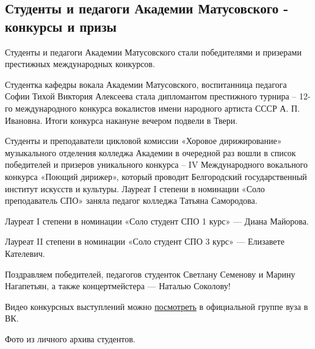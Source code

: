  
 
 
 
 
\subsection{Студенты и педагоги Академии Матусовского - конкурсы и призы}


Студенты и педагоги Академии Матусовского стали победителями и призерами
престижных международных конкурсов.


Студентка кафедры вокала Академии Матусовского, воспитанница педагога Софии
Тихой Виктория Алексеева стала дипломантом престижного турнира – 12-го
международного конкурса вокалистов имени народного артиста СССР А. П. Ивановна.
Итоги конкурса накануне вечером подвели в Твери.

Студенты и преподаватели цикловой комиссии «Хоровое дирижирование» музыкального
отделения колледжа Академии в очередной раз вошли в список победителей и
призеров уникального конкурса – IV Международного вокального конкурса «Поющий
дирижер», который проводит Белгородский государственный институт искусств и
культуры.  Лауреат I степени в номинации «Соло преподаватель СПО» заняла
педагог колледжа Татьяна Самородова.


Лауреат I степени в номинации «Соло студент СПО 1 курс» — Диана Майорова.

Лауреат II степени в номинации «Соло студент СПО 3 курс» — Елизавете Кателевич.

Поздравляем победителей, педагогов студенток Светлану Семенову и Марину
Нагапетьян, а также концертмейстера — Наталью Соколову!

Видео конкурсных выступлений можно
\href{https://vk.com/wall-972076_33328}{посмотреть} в официальной группе вуза в
ВК.

Фото из личного архива студентов.



